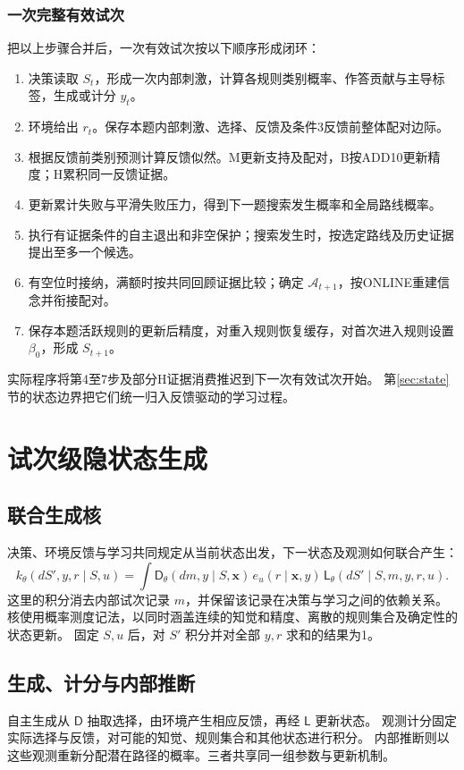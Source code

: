 \documentclass[11pt,a4paper]{article}
\numberwithin{equation}{section}
\newcommand{\A}{\mathcal{A}}
\newcommand{\Dd}{\mathsf{D}}
\newcommand{\Ll}{\mathsf{L}}
\begin{document}
\subsubsection{一次完整有效试次}
\label{sec:order}
把以上步骤合并后，一次有效试次按以下顺序形成闭环：
\begin{enumerate}
\item 决策读取 $S_t$，形成一次内部刺激，计算各规则类别概率、作答贡献与主导标签，生成或计分 $y_t$。
\item 环境给出 $r_t$。保存本题内部刺激、选择、反馈及条件3反馈前整体配对边际。
\item 根据反馈前类别预测计算反馈似然。M更新支持及配对，B按ADD10更新精度；H累积同一反馈证据。
\item 更新累计失败与平滑失败压力，得到下一题搜索发生概率和全局路线概率。
\item 执行有证据条件的自主退出和非空保护；搜索发生时，按选定路线及历史证据提出至多一个候选。
\item 有空位时接纳，满额时按共同回顾证据比较；确定 $\A_{t+1}$，按ONLINE重建信念并衔接配对。
\item 保存本题活跃规则的更新后精度，对重入规则恢复缓存，对首次进入规则设置 $\beta_0$，形成 $S_{t+1}$。
\end{enumerate}
实际程序将第4至7步及部分H证据消费推迟到下一次有效试次开始。
第\ref{sec:state}节的状态边界把它们统一归入反馈驱动的学习过程。

\section{试次级隐状态生成}
\label{sec:kernel}

\subsection{联合生成核}
决策、环境反馈与学习共同规定从当前状态出发，下一状态及观测如何联合产生：
\begin{equation}
k_\theta(dS',y,r\mid S,u)=
\int \Dd_\theta(dm,y\mid S,\bm x)\,
e_u(r\mid\bm x,y)\,
\Ll_\theta(dS'\mid S,m,y,r,u).
\label{eq:kernel}
\end{equation}
这里的积分消去内部试次记录 $m$，并保留该记录在决策与学习之间的依赖关系。
核使用概率测度记法，以同时涵盖连续的知觉和精度、离散的规则集合及确定性的状态更新。
固定 $S,u$ 后，对 $S'$ 积分并对全部 $y,r$ 求和的结果为1。

\subsection{生成、计分与内部推断}
自主生成从 $\Dd$ 抽取选择，由环境产生相应反馈，再经 $\Ll$ 更新状态。
观测计分固定实际选择与反馈，对可能的知觉、规则集合和其他状态进行积分。
内部推断则以这些观测重新分配潜在路径的概率。三者共享同一组参数与更新机制。
\end{document}
